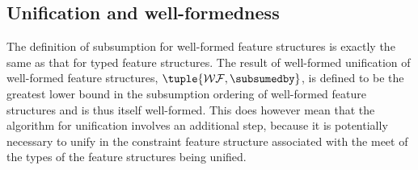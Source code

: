 \documentclass[12pt]{report}
\begin{document}
\subsection{Unification and well-formedness}
\label{formunif}
The definition of subsumption for well-formed feature structures is 
exactly the same as
that for typed feature structures.  
The result of well-formed unification of well-formed feature structures, 
$\tuple{{\cal WF}, \subsumedby}$,
is defined to be the greatest lower bound in the subsumption ordering 
of well-formed 
feature structures and is thus itself well-formed.  
This does however mean that 
the algorithm for unification involves an additional step, because 
it is potentially
necessary to unify in the constraint feature structure associated with the meet
of the types of the feature structures being unified.  
\end{document}
